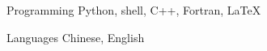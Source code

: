 


\begin{cvskills}


\cvskill
{Programming} %
{Python, shell, C++, Fortran, LaTeX} %



\cvskill
{Languages} %
{Chinese, English} %


\end{cvskills}
